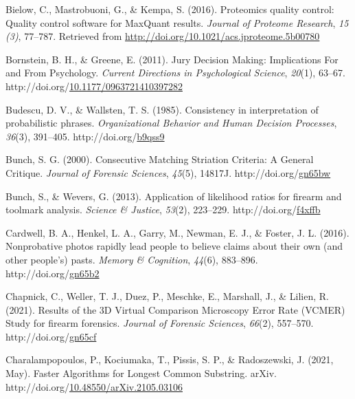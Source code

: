 \documentclass[print]{nuthesis}
\newlength{\cslhangindent}
\newenvironment{CSLReferences}[2]%
{\setlength{\parindent}{0pt}%
\everypar{\setlength{\hangindent}{\cslhangindent}}\ignorespaces}%
{\par}
\begin{document}
\begin{CSLReferences}{1}{0}
\leavevmode{}%
Bielow, C., Mastrobuoni, G., \& Kempa, S. (2016). Proteomics quality control: Quality control software for MaxQuant results. \emph{Journal of Proteome Research}, \emph{15 (3)}, 77--787. Retrieved from \url{http://doi.org/10.1021/acs.jproteome.5b00780}

\leavevmode{}%
Bornstein, B. H., \& Greene, E. (2011). Jury {Decision} {Making}: {Implications} {For} and {From} {Psychology}. \emph{Current Directions in Psychological Science}, \emph{20}(1), 63--67. http://doi.org/\href{https://doi.org/10.1177/0963721410397282}{10.1177/0963721410397282}

\leavevmode{}%
Budescu, D. V., \& Wallsten, T. S. (1985). Consistency in interpretation of probabilistic phrases. \emph{Organizational Behavior and Human Decision Processes}, \emph{36}(3), 391--405. http://doi.org/\href{https://doi.org/b9qss9}{b9qss9}

\leavevmode{}%
Bunch, S. G. (2000). Consecutive {Matching} {Striation} {Criteria}: {A} {General} {Critique}. \emph{Journal of Forensic Sciences}, \emph{45}(5), 14817J. http://doi.org/\href{https://doi.org/gn65bw}{gn65bw}

\leavevmode{}%
Bunch, S., \& Wevers, G. (2013). Application of likelihood ratios for firearm and toolmark analysis. \emph{Science \& Justice}, \emph{53}(2), 223--229. http://doi.org/\href{https://doi.org/f4xffb}{f4xffb}

\leavevmode{}%
Cardwell, B. A., Henkel, L. A., Garry, M., Newman, E. J., \& Foster, J. L. (2016). Nonprobative photos rapidly lead people to believe claims about their own (and other people's) pasts. \emph{Memory \& Cognition}, \emph{44}(6), 883--896. http://doi.org/\href{https://doi.org/gn65b2}{gn65b2}

\leavevmode{}%
Chapnick, C., Weller, T. J., Duez, P., Meschke, E., Marshall, J., \& Lilien, R. (2021). Results of the {3D} {Virtual} {Comparison} {Microscopy} {Error} {Rate} ({VCMER}) {Study} for firearm forensics. \emph{Journal of Forensic Sciences}, \emph{66}(2), 557--570. http://doi.org/\href{https://doi.org/gn65cf}{gn65cf}

\leavevmode{}%
Charalampopoulos, P., Kociumaka, T., Pissis, S. P., \& Radoszewski, J. (2021, May). Faster {Algorithms} for {Longest} {Common} {Substring}. arXiv. http://doi.org/\href{https://doi.org/10.48550/arXiv.2105.03106}{10.48550/arXiv.2105.03106}


\end{CSLReferences}
\end{document}
